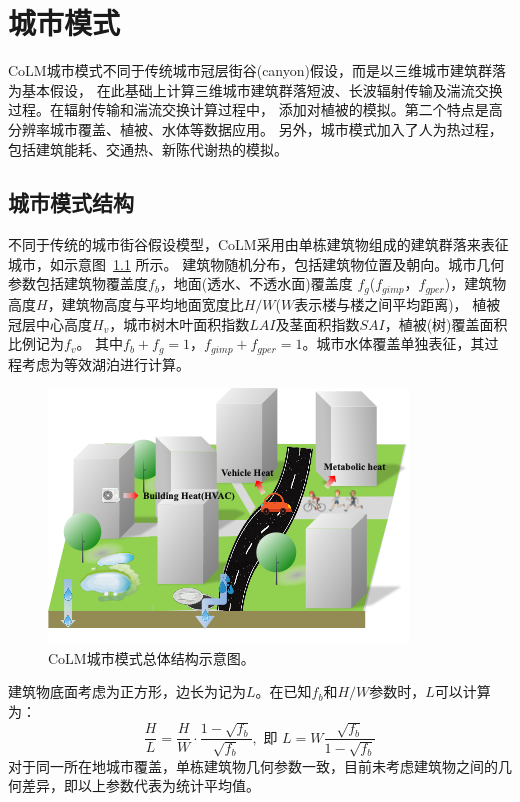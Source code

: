 \chapter{城市模式}\label{城市模式}
CoLM城市模式不同于传统城市冠层街谷(canyon)假设，而是以三维城市建筑群落为基本假设，
在此基础上计算三维城市建筑群落短波、长波辐射传输及湍流交换过程。在辐射传输和湍流交换计算过程中，
添加对植被的模拟。第二个特点是高分辨率城市覆盖、植被、水体等数据应用。
另外，城市模式加入了人为热过程，包括建筑能耗、交通热、新陈代谢热的模拟。


\section{城市模式结构}
不同于传统的城市街谷假设模型，CoLM采用由单栋建筑物组成的建筑群落来表征城市，如示意图~\ref{fig:CoLM城市模式总体结构示意图} 所示。
建筑物随机分布，包括建筑物位置及朝向。城市几何参数包括建筑物覆盖度$f_b$，地面(透水、不透水面)覆盖度
$f_g$($f_{gimp}$，$f_{gper}$)，建筑物高度$H$，建筑物高度与平均地面宽度比$H/W$($W$表示楼与楼之间平均距离)，
植被冠层中心高度$H_v$，城市树木叶面积指数$LAI$及茎面积指数$SAI$，植被(树)覆盖面积比例记为$f_v$。
其中$f_b+f_g=1$，$f_{gimp}+f_{gper}=1$。城市水体覆盖单独表征，其过程考虑为等效湖泊进行计算。
{
\begin{figure}[]
\centering
\includegraphics{Figures/城市模式/CoLM城市模式总体结构示意图.png}
\caption{CoLM城市模式总体结构示意图。}
\label{fig:CoLM城市模式总体结构示意图}
\end{figure}
}

建筑物底面考虑为正方形，边长为记为$L$。在已知$f_b$和$H/W$参数时，$L$可以计算为：
\begin{equation}
\frac{H}{L}=\frac{H}{W} \cdot \frac{1-\sqrt{f_{b}}}{\sqrt{f_{b}}}, \text { 即 } L=W \frac{\sqrt{f_{b}}}{1-\sqrt{f_{b}}}
\end{equation}
对于同一所在地城市覆盖，单栋建筑物几何参数一致，目前未考虑建筑物之间的几何差异，即以上参数代表为统计平均值。

